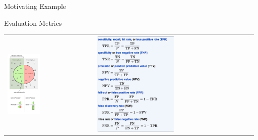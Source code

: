\documentclass[10pt]{beamer}
\begin{document}
\begin{frame}{Motivating Example}

\end{frame}

\begin{frame}{Evaluation Metrics}
\begin{tabular}{p{5cm} p{7cm}}
    \vspace{0pt}
    \includegraphics[width=0.4\textwidth]{figures/precisionrecall.png}
    &
    \vspace{0pt}
    \includegraphics[width=0.5\textwidth]{figures/precisionrecall-formulas.png}
\end{tabular}
\end{frame}
\end{document}
